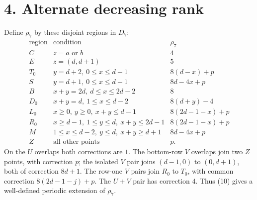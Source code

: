 \documentclass[11pt]{article}
\begin{document}
\section*{4. Alternate decreasing rank}
Define $\rho_7$ by these disjoint regions in $D_7$:
\[
\begin{array}{c|l|l}
\text{region}&\text{condition}&\rho_7\\\hline
C&z=a\text{ or }b&4\\
E&z=(d,d+1)&5\\
T_0&y=d+2,\ 0\le x\le d-1&8(d-x)+p\\
S&y=d+1,\ 0\le x\le d-1&8d-4x+p\\
B&x+y=2d,\ d\le x\le2d-2&8\\
D_0&x+y=d,\ 1\le x\le d-2&8(d+y)-4\\
L_0&x\ge0,\ y\ge0,\ x+y\le d-1&8(2d-1-x)+p\\
R_0&x\ge d-1,\ 1\le y\le d,\ x+y\le2d-1&8(2d-1-x)+p\\
M&1\le x\le d-2,\ y\le d,\ x+y\ge d+1&8d-4x+p\\
Z&\text{all other points}&p.
\end{array}                                                    \tag{13}
\]
On the $U$ overlaps both corrections are $1$. The bottom-row $V$
overlaps join two $Z$ points, with correction $p$; the isolated $V$
pair joins $(d-1,0)$ to $(0,d+1)$, both of correction $8d+1$.
The row-one $V$ pairs join $R_0$ to $T_0$, with common correction
$8(2d-1-j)+p$. The $U+V$ pair has correction $4$.
Thus (10) gives a well-defined periodic extension of $\rho_7$.
\end{document}
